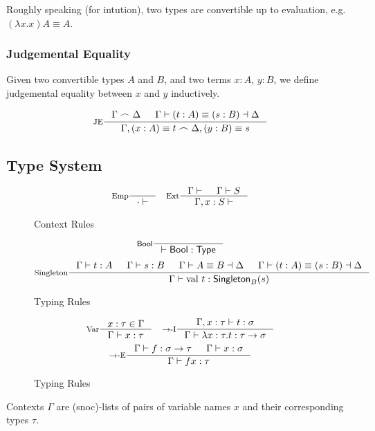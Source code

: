 Roughly speaking (for intution), two types are convertible up to evaluation, e.g. $(\lambda x. x) A \equiv A$.

\subsubsection{Judgemental Equality}
Given two convertible types $A$ and $B$, and two terms $x : A$, $y : B$, we define judgemental equality between $x$ and $y$ inductively.



\[
  \inference[JE]
  { \twin{\Gamma}{\Delta}
  & \Gamma \vdash (t : A) \equiv (s : B) \dashv \Delta
  }
  {\twin{\Gamma, (x : A) \equiv t}{\Delta, (y : B) \equiv s}}
\]


\subsection{Type System}
\begin{figure*}[h]
  \[
    \inference[Emp]{}
                    {\cdot \vdash}
    \quad
    \inference[Ext]{\Gamma \vdash & \Gamma \vdash S}
                     {\Gamma, x : S \vdash}
  \]

  \caption*{Context Rules}
  \label{fig:base-dt-kinding}
\end{figure*}

\begin{figure*}[h]
  \[
    \inference[\Bool]{}
                    {\vdash \Bool : \Type}
  \]
  \[
    \inference[Singleton]{\Gamma \vdash t : A & \Gamma \vdash s : B & \Gamma \vdash A \equiv B \dashv \Delta & \Gamma \vdash (t : A) \equiv (s : B) \dashv \Delta}
                     {\Gamma \vdash \val{t} : \Singleton{B}{s}}
  \]

  \caption*{Typing Rules}
  \label{fig:base-dt-kinding}
\end{figure*}

\begin{figure*}[h]
  \[
    \inference[Var]{x : \tau \in \Gamma}
                   {\Gamma \vdash x : \tau}
    \quad
    \inference[\Intro{$\to$}]{\Gamma, x : \tau \vdash t : \sigma}
                             {\Gamma \vdash \lambda x : \tau. t : \tau \to \sigma}
  \]
  \[
    \inference[\Elim{$\to$}]{\Gamma \vdash f : \sigma \to \tau & \Gamma \vdash x : \sigma}
                            {\Gamma \vdash f x : \tau}
  \]

  \caption*{Typing Rules}
  \label{fig:base-dt-typing}
\end{figure*}

Contexts $\Gamma$ are (snoc)-lists of pairs of variable names $x$ and their corresponding types $\tau$.
